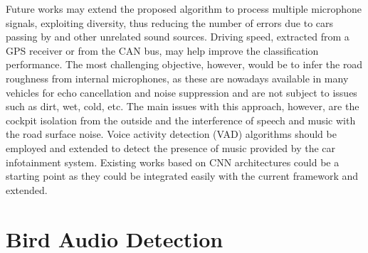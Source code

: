 Future works may extend the proposed algorithm to process multiple microphone signals, exploiting diversity, thus reducing the number of errors due to cars passing by and other unrelated sound sources. Driving speed, extracted from a GPS receiver or from the CAN bus, may help improve the classification performance. The most challenging objective, however, would be to infer the road roughness from internal microphones, as these are nowadays available in many vehicles for echo cancellation and noise suppression and are not subject to issues such as dirt, wet, cold, etc. The main issues with this approach, however, are the cockpit isolation from the outside and the interference of speech and music with the road surface noise. Voice activity detection (VAD) \cite{Ephraim:1984,ghosh2011robust} algorithms should be employed and extended to detect the presence of music provided by the car infotainment system. Existing works based on CNN architectures \cite{wirn2016-vad,ijcnn2016-vad} could be a starting point as they could be integrated easily with the current framework and extended.


%


\section{Bird Audio Detection}


